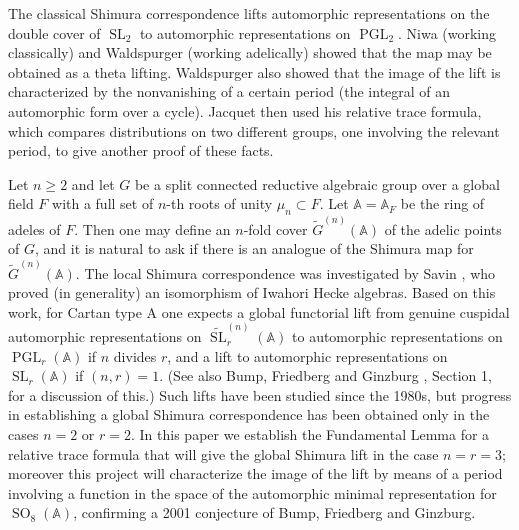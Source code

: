 \documentclass[12pt]{amsart}
\newcommand{\PGL}{\operatorname{PGL}}
\newcommand{\SL}{\operatorname{SL}}
\newcommand{\SO}{\operatorname{SO}}
\newcommand{\A}{\mathbb{A}}
\theoremstyle{remark}
\begin{document}
The classical Shimura correspondence \cite{MR0332663} lifts automorphic representations on the double cover of $\SL_2$ to automorphic representations on $\PGL_2$.  Niwa \cite{MR0364106} (working classically) and 
Waldspurger \cite{MR577010} (working adelically) showed that the map may be obtained as a theta lifting. Waldspurger 
also showed that the image of the lift is characterized by the nonvanishing of a certain period (the integral of an automorphic form over a cycle). Jacquet \cite{MR983610} then used his relative trace formula, 
which compares distributions on two different groups, one involving the relevant period, to give another proof of these facts.  


Let  $n\geq2$ and let $G$ be a split connected reductive algebraic group over a global field $F$ with a full
set of $n$-th roots of unity $\mu_n\subset F$.  Let  $\A=\A_F$ be the ring of adeles of $F$. 
Then one may define an $n$-fold cover $\widetilde{G}^{(n)}(\mathbb{A})$ of the adelic points of $G$, and it is natural to ask if there is an analogue of the Shimura map for $\widetilde{G}^{(n)}(\mathbb{A})$. 
The local Shimura correspondence was investigated by Savin \cite{MR929534}, who proved (in generality) an isomorphism of Iwahori Hecke algebras.
Based on this work, for Cartan type A one expects a global functorial lift from genuine cuspidal automorphic representations on $\widetilde{\SL}_r^{(n)}(\A)$ to automorphic
representations on $\PGL_r(\A)$ if $n$ divides $r$, and a lift to automorphic representations on $\SL_r(\A)$ if $(n,r)=1$. (See also
 Bump, Friedberg and Ginzburg \cite{MR1882041}, Section 1, for a discussion of this.)   Such lifts have been studied since the 1980s,  but progress in establishing a global Shimura
 correspondence has been obtained only in the cases $n=2$ or $r=2$.
In this paper we establish the Fundamental Lemma for a relative trace formula
that will give the global Shimura lift in the case $n=r=3$; moreover this project will
characterize the image of the lift by means of a period involving a function in the space of the automorphic minimal representation for $\SO_8(\A)$, confirming a 2001 conjecture of Bump, Friedberg and Ginzburg.
\end{document}
